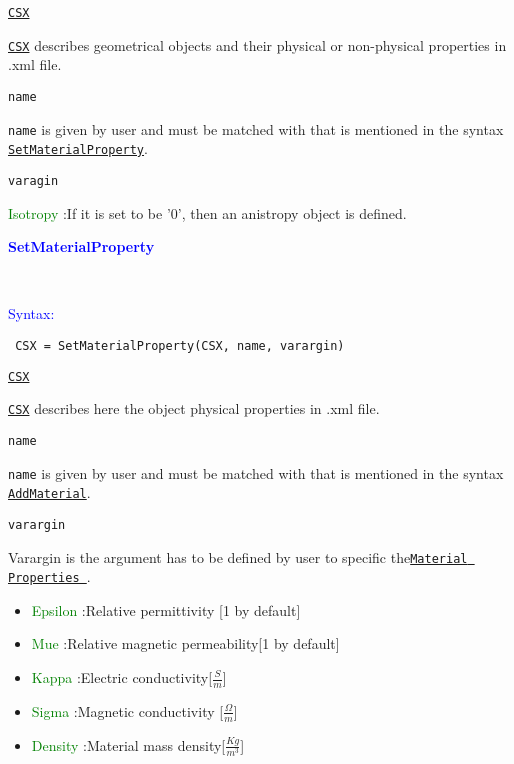  \hyperref[para:CSX]{\texttt{CSX}} 
 \begin{myindentpar}\hyperref[para:CSX]{\texttt{CSX}} describes geometrical objects and their physical or non-physical properties in .xml file.
 \end{myindentpar} 
 \texttt{name} 
 \begin{myindentpar}{\texttt{name}} is given by user and must be matched with that is mentioned in the syntax 
 \hyperref[para:SetMaterialProperty]{\texttt{SetMaterialProperty}}.
 \end{myindentpar} 
 \texttt{varagin} 
\begin{myindentpar} 
  \textcolor{green}{Isotropy} :If it is set to be '0', then an anistropy object is defined. 
\end{myindentpar} 


\textcolor{blue}{\begin{large}\textbf{SetMaterialProperty}\end{large}}\\
 \textcolor{blue}{\begin{large}Syntax:\end{large}}
  \begin{lstlisting}
 CSX = SetMaterialProperty(CSX, name, varargin)
  \end{lstlisting}
  \hyperref[para:CSX]{\texttt{CSX}} 
 \begin{myindentpar}\hyperref[para:CSX]{\texttt{CSX}} describes here the object physical properties in .xml file.
 \end{myindentpar} 
 \texttt{name} 
 \begin{myindentpar}{\texttt{name}} is given by user and must be matched with that is mentioned in the syntax 
 \hyperref[para:AddMaterial]{\texttt{AddMaterial}}.
 \end{myindentpar} 
 \texttt{varargin}
 \begin{myindentpar} Varargin is the argument has to be defined by user to specific the{\hyperref[para:Material Properties ]{\texttt{Material Properties }}}. 
  \begin{itemize}
  \item \textcolor{green}{Epsilon} :Relative permittivity [1 by default]
   \item \textcolor{green}{Mue}     :Relative magnetic permeability[1 by default]
  \item \textcolor{green}{Kappa}   :Electric conductivity[$\frac{S}{m}$]
  \item \textcolor{green}{Sigma}   :Magnetic conductivity [$\frac{\Omega}{m}$]
  \item \textcolor{green}{Density} :Material mass density[$\frac{Kg}{m^{3}}$] 
  \end{itemize}
 \end{myindentpar}



